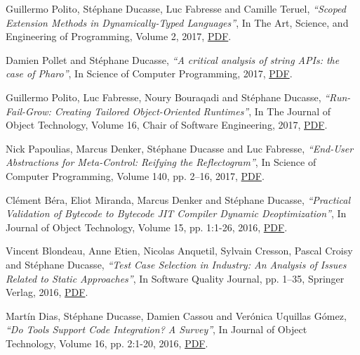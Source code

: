 \documentclass{article}
\newcommand{\czauthors}[1]{#1}
\newcommand{\cztitle}[1]{\emph{``#1''}}
\newcommand{\czjournal}[1]{#1}
\begin{document}
\begin{itemize}
	\pub  \czauthors{Guillermo Polito, St\'ephane Ducasse, Luc Fabresse and Camille Teruel},  \cztitle{Scoped Extension Methods in Dynamically-Typed Languages},  In \czjournal{The Art, Science, and Engineering of Programming}, Volume 2, 2017, \href{http://rmod-files.lille.inria.fr/Team/Texts/Papers/Poli17d-Programming-ScopedExtensions.pdf}{PDF}.

	\pub  \czauthors{Damien Pollet and St\'ephane Ducasse},  \cztitle{A critical analysis of string APIs: the case of Pharo},  In \czjournal{Science of Computer Programming}, 2017, \href{http://rmod-files.lille.inria.fr/Team/Texts/Papers/Poll17a-SCICO-StringAPI.pdf}{PDF}.

	\pub  \czauthors{Guillermo Polito, Luc Fabresse, Noury Bouraqadi and St\'ephane Ducasse},  \cztitle{Run-Fail-Grow: Creating Tailored Object-Oriented Runtimes},  In \czjournal{The Journal of Object Technology}, Volume 16, Chair of Software Engineering, 2017, \href{http://rmod-files.lille.inria.fr/Team/Texts/Papers/Poli17c-JOT-Tornado.pdf}{PDF}.

	\pub  \czauthors{Nick Papoulias, Marcus Denker, St\'ephane Ducasse and Luc Fabresse},  \cztitle{End-User Abstractions for Meta-Control: Reifying the Reflectogram},  In \czjournal{Science of Computer Programming}, Volume 140, pp. 2--16, 2017, \href{http://rmod-files.lille.inria.fr/Team/Texts/Papers/Papo16a-reflectogram-scp.pdf}{PDF}.

	\pub  \czauthors{Cl\'ement B\'era, Eliot Miranda, Marcus Denker and St\'ephane Ducasse},  \cztitle{Practical Validation of Bytecode to Bytecode JIT Compiler Dynamic Deoptimization},  In \czjournal{Journal of Object Technology}, Volume 15, pp. 1:1-26, 2016, \href{http://rmod-files.lille.inria.fr/Team/Texts/Papers/Bera16aPracticalValidation-JOT.pdf}{PDF}.

	\pub  \czauthors{Vincent Blondeau, Anne Etien, Nicolas Anquetil, Sylvain Cresson, Pascal Croisy and St\'ephane Ducasse},  \cztitle{Test Case Selection in Industry: An Analysis of Issues Related to Static Approaches},  In \czjournal{Software Quality Journal}, pp. 1--35, Springer Verlag, 2016, \href{http://rmod-files.lille.inria.fr/Team/Texts/Papers/Blon16a-SoftwareQualityJournal-TestCaseSelectionInIndustry.pdf}{PDF}.

	\pub  \czauthors{Mart\'in Dias, St\'ephane Ducasse, Damien Cassou and Ver\'{o}nica Uquillas G\'{o}mez},  \cztitle{Do Tools Support Code Integration? A Survey},  In \czjournal{Journal of Object Technology}, Volume 16, pp. 2:1-20, 2016, \href{http://rmod-files.lille.inria.fr/Team/Texts/Papers/Dias16a-IntegratorSurvey.pdf}{PDF}.


\end{itemize}
\end{document}
